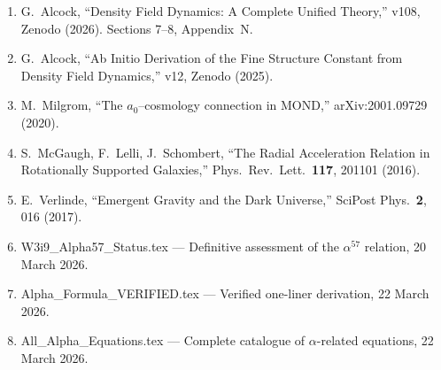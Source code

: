 \documentclass[12pt,a4paper]{article}
\begin{document}
\begin{enumerate}
\item[{[1]}] G.~Alcock, ``Density Field Dynamics: A Complete Unified Theory,''
  v108, Zenodo (2026). Sections 7--8, Appendix~N.

\item[{[2]}] G.~Alcock, ``Ab Initio Derivation of the Fine Structure Constant
  from Density Field Dynamics,'' v12, Zenodo (2025).

\item[{[3]}] M.~Milgrom, ``The $a_0$--cosmology connection in MOND,''
  arXiv:2001.09729 (2020).

\item[{[4]}] S.~McGaugh, F.~Lelli, J.~Schombert, ``The Radial Acceleration
  Relation in Rotationally Supported Galaxies,'' Phys.\ Rev.\ Lett.\
  \textbf{117}, 201101 (2016).

\item[{[5]}] E.~Verlinde, ``Emergent Gravity and the Dark Universe,''
  SciPost Phys.\ \textbf{2}, 016 (2017).

\item[{[6]}] W3i9\_Alpha57\_Status.tex --- Definitive assessment of the
  $\alpha^{57}$ relation, 20 March 2026.

\item[{[7]}] Alpha\_Formula\_VERIFIED.tex --- Verified one-liner derivation,
  22 March 2026.

\item[{[8]}] All\_Alpha\_Equations.tex --- Complete catalogue of
  $\alpha$-related equations, 22 March 2026.
\end{enumerate}
\end{document}
